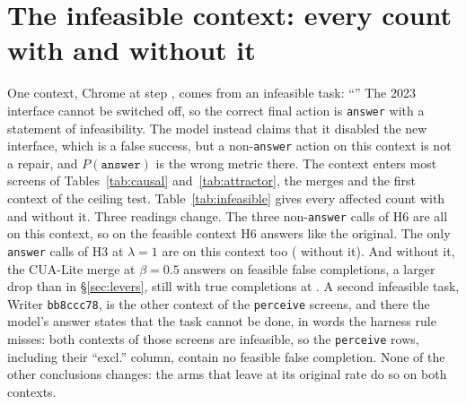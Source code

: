 \section{The infeasible context: every count with and without it}
\label{app:infeasible}
One \fsp{} context, Chrome \texttt{\infTask} at step \infStep, comes from an infeasible task: ``\infTaskInstruction'' The 2023 interface cannot be switched off, so the correct final action is \texttt{answer} with a statement of infeasibility. The model instead claims that it disabled the new interface, which is a false success, but a non-\texttt{answer} action on this context is not a repair, and $P(\texttt{answer})$ is the wrong metric there. %
The context enters most screens of Tables~\ref{tab:causal} and~\ref{tab:attractor}, the merges and the first context of the ceiling test. Table~\ref{tab:infeasible} gives every affected count with and without it. Three readings change. The three non-\texttt{answer} calls of H6 are all on this context, so on the feasible \fsp{} context H6 answers \infFreeHsixExcl{} like the original. The only \texttt{answer} calls of H3 at $\lambda=1$ are on this context too (\infFreeHthreefullExcl{} without it). And without it, the CUA-Lite merge at $\beta=0.5$ answers on \infMergeCuaHalfExcl{} feasible false completions, a larger drop than in \S\ref{sec:levers}, still with true completions at \mergeCuaFsm. A second infeasible task, Writer \texttt{bb8ccc78}, is the other \fsp{} context of the \texttt{perceive} screens, and there the model's answer states that the task cannot be done, in words the harness rule misses: both \fsp{} contexts of those screens are infeasible, so the \texttt{perceive} rows, including their ``excl.'' column, contain no feasible false completion. %
None of the other conclusions changes: the arms that leave \fsp{} at its original rate do so on both contexts. %

\begin{table}[h]
\centering\scriptsize
\resizebox{\linewidth}{!}{}
\caption{\fsp{} \texttt{answer} counts with and without the infeasible context \texttt{\infTask}@\infStep, for every arm that includes it. $^{*}$Split implied exactly by the arm's cohort, because every \fsp{} output answered. Sources whose files carry no task identifiers are listed at the bottom.}
\label{tab:infeasible}
\end{table}
\FloatBarrier
